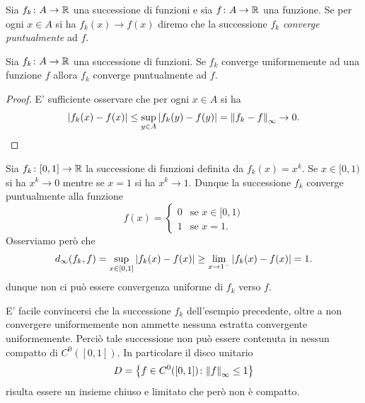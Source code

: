\begin{definition}
\mymark{***}
Sia $f_k\colon A \to {\mathbb R}$ una successione di funzioni
e sia $f\colon A \to {\mathbb R}$ una funzione.
Se per ogni $x\in A$ si ha $f_k(x)\to f(x)$ diremo che
la successione $f_k$
\emph{converge puntualmente}
ad $f$.
\end{definition}

\begin{theorem}
\mymark{***}
Sia $f_k\colon A \to {\mathbb R}$ una successione di funzioni.
Se $f_k$ converge uniformemente ad una funzione $f$ allora $f_k$ converge puntualmente ad $f$.
\end{theorem}
%
\begin{proof}
E' sufficiente osservare che per ogni $x\in A$ si ha
\[
  {\left|f_k(x)-f(x)\right|} \le \sup_{y\in A} {\left|f_k(y)-f(y)\right|}
   = {\left\Vert f_k-f\right\Vert}_\infty \to 0.
\]
\end{proof}

\begin{example}
\mymark{***}%
\label{ex:puntuale_non_uniforme}%
Sia $f_k\colon [0,1]\to {\mathbb R}$ la successione di funzioni definita da $f_k(x)=x^k$. Se $x\in[0,1)$ si ha $x^k \to 0$ mentre se $x=1$ si ha $x^k \to 1$. 
Dunque la successione $f_k$ converge puntualmente alla funzione
\[
f(x) =
 \begin{cases}
  0 & \text{se $x\in [0,1)$}\\
  1 & \text{se $x=1$}.
 \end{cases}
\]
Osserviamo però che
\[
  d_\infty(f_k,f) = \sup_{x\in [0,1]} {\left|f_k(x)-f(x)\right|}
  \ge \lim_{x\to 1^-} {\left|f_k(x) - f(x)\right|} = 1.
\]
dunque non ci può essere convergenza uniforme di $f_k$ verso $f$.
\end{example}

E' facile convincersi che la successione $f_k$ dell'esempio precedente, oltre a non convergere uniformemente non ammette nessuna estratta convergente uniformemente. Perciò tale successione non può essere contenuta in nessun compatto di $C^0([0,1])$. In particolare il disco unitario
\[
  D = {\left\{ f\in C^0([0,1])\colon {\left\Vert f\right\Vert}_\infty \le 1 \right\}}
\]
risulta essere un insieme chiuso e limitato che però non è compatto.

